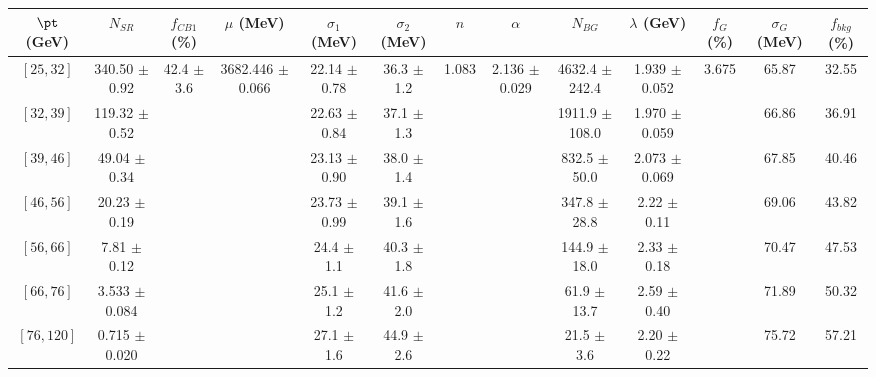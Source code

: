 \begin{tabular}{c||c|c|c|c|c|c|c|c|c|c|c||c}
$\pt$ (GeV) & $N_{SR}$ & $f_{CB1}$ (\%) & $\mu$ (MeV) & $\sigma_1$ (MeV) & $\sigma_2$ (MeV) & $n$ & $\alpha$ & $N_{BG}$ & $\lambda$ (GeV) & $f_G$ (\%) & $\sigma_G$ (MeV) & $f_{bkg}$ (\%) \\
\hline
$[25, 32]$ & 340.50 $\pm$ 0.92 & \multirow{7}{*}{42.4 $\pm$ 3.6} & \multirow{7}{*}{3682.446 $\pm$ 0.066} & 22.14 $\pm$ 0.78 & 36.3 $\pm$ 1.2 & \multirow{7}{*}{1.083} & \multirow{7}{*}{2.136 $\pm$ 0.029} & 4632.4 $\pm$ 242.4 & 1.939 $\pm$ 0.052 & \multirow{7}{*}{3.675} & 65.87 & 32.55\\
$[32, 39]$ & 119.32 $\pm$ 0.52 &  &  & 22.63 $\pm$ 0.84 & 37.1 $\pm$ 1.3 &  &  & 1911.9 $\pm$ 108.0 & 1.970 $\pm$ 0.059 &  & 66.86 & 36.91\\
$[39, 46]$ & 49.04 $\pm$ 0.34 &  &  & 23.13 $\pm$ 0.90 & 38.0 $\pm$ 1.4 &  &  & 832.5 $\pm$ 50.0 & 2.073 $\pm$ 0.069 &  & 67.85 & 40.46\\
$[46, 56]$ & 20.23 $\pm$ 0.19 &  &  & 23.73 $\pm$ 0.99 & 39.1 $\pm$ 1.6 &  &  & 347.8 $\pm$ 28.8 & 2.22 $\pm$ 0.11 &  & 69.06 & 43.82\\
$[56, 66]$ & 7.81 $\pm$ 0.12 &  &  & 24.4 $\pm$ 1.1 & 40.3 $\pm$ 1.8 &  &  & 144.9 $\pm$ 18.0 & 2.33 $\pm$ 0.18 &  & 70.47 & 47.53\\
$[66, 76]$ & 3.533 $\pm$ 0.084 &  &  & 25.1 $\pm$ 1.2 & 41.6 $\pm$ 2.0 &  &  & 61.9 $\pm$ 13.7 & 2.59 $\pm$ 0.40 &  & 71.89 & 50.32\\
$[76, 120]$ & 0.715 $\pm$ 0.020 &  &  & 27.1 $\pm$ 1.6 & 44.9 $\pm$ 2.6 &  &  & 21.5 $\pm$ 3.6 & 2.20 $\pm$ 0.22 &  & 75.72 & 57.21\\
\end{tabular}
